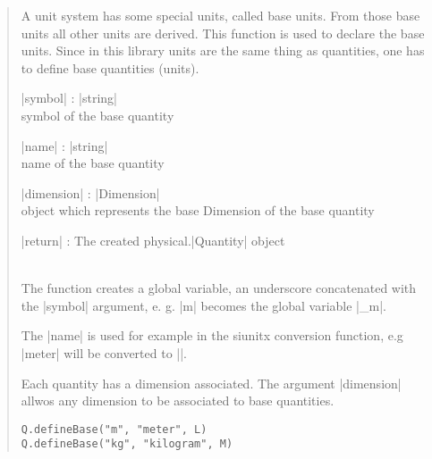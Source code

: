 \documentclass{ltxdoc}
\begin{document}
\begin{quote}
  A unit system has some special units, called base units. From those base units all other units are derived. This function is used to declare the base units. Since in this library units are the same thing as quantities, one has to define base quantities (units). 

  \subtitle{Parameters}
  \begin{description}
  \item |symbol| : |string|\\
    symbol of the base quantity

  \item |name| : |string|\\
    name of the base quantity

  \item |dimension| : |Dimension|\\
    object which represents the base Dimension of the base quantity

  \item |return| : The created physical.|Quantity| object
  \end{description}

  \subtitle{Notes}\\
  The function creates a global variable, an underscore concatenated with the |symbol| argument, e. g. |m| becomes the global variable |_m|.

  The |name| is used for example in the siunitx conversion function, e.g |meter| will be converted to |\meter|. 

  Each quantity has a dimension associated. The argument |dimension| allwos any dimension to be associated to base quantities. 

  \subtitle{Examples}
  \begin{lstlisting}
Q.defineBase("m", "meter", L)
Q.defineBase("kg", "kilogram", M)
  \end{lstlisting}
\end{quote}
\end{document}
